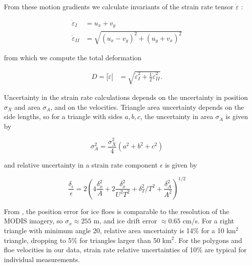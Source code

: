 \documentclass[aog]{igs}
\begin{document}
From these motion gradients we calculate invariants of the strain rate tensor $\dot\varepsilon$ \citep{lepparanta2011_DriftSea}:
\begin{linenomath*}
\begin{align}
    \dot\varepsilon_{I} &= u_x + v_y \\\dot\varepsilon_{II} &= \sqrt{(u_x - v_y)^2 + (u_y + v_x)^2} 
\end{align}
\end{linenomath*}
from which we compute the total deformation
\begin{linenomath*}
\begin{align}
   D = |\dot\varepsilon| &= \sqrt{\dot\varepsilon_{I}^2 + \frac{1}{2}\dot\varepsilon_{II}^2}.
\end{align}
\end{linenomath*}
Uncertainty in the strain rate calculations depends on the uncertainty in position $\sigma_X$ and area $\sigma_A$, and on the velocities. Triangle area uncertainty depends on the side lengths, so for a triangle with sides $a, b, c$, the uncertainty in area $\sigma_A$ is given by
\begin{linenomath*}
\begin{equation}
\sigma_A^2 = \frac{\sigma_X^2}{4}(a^2 + b^2 + c^2)
\end{equation}
\end{linenomath*}
and relative uncertainty in a strain rate component $\epsilon$
is given by
\begin{linenomath*}
\begin{equation}
    \frac{\delta_\epsilon}{\epsilon} = 2\left(4 \frac{\delta_x^2}{A} + 2 \frac{\delta_x^2}{U^2T^2} + \delta_T^2/T^2 + \frac{\delta_A^2}{A^2}\right)^{1/2}
\end{equation}
\end{linenomath*}
From \cite{lopez-acosta2019_IceFloe}, the position error for ice floes is comparable to the resolution of the MODIS imagery, so $\sigma_x \approx 255$ m, and ice drift error $\approx 0.65$ cm/s. 
For a right triangle with minimum angle 20, relative area uncertainty is 14\% for a 10 km$^2$ triangle, dropping to 5\% for triangles larger than 50 km$^2$. For the polygons and floe velocities in our data, strain rate relative uncertainties of 10\% are typical for individual measurements. 
\end{document}
